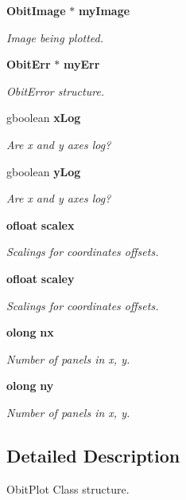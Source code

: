 \begin{CompactItemize}
{\bf Obit\-Image} $\ast$ {\bf my\-Image}
\begin{CompactList}\small\item\em Image being plotted. \item\end{CompactList}\item 
{\bf Obit\-Err} $\ast$ {\bf my\-Err}
\begin{CompactList}\small\item\em Obit\-Error structure. \item\end{CompactList}\item 
gboolean {\bf x\-Log}
\begin{CompactList}\small\item\em Are x and y axes log? \item\end{CompactList}\item 
gboolean {\bf y\-Log}
\begin{CompactList}\small\item\em Are x and y axes log? \item\end{CompactList}\item 
{\bf ofloat} {\bf scalex}
\begin{CompactList}\small\item\em Scalings for coordinates offsets. \item\end{CompactList}\item 
{\bf ofloat} {\bf scaley}
\begin{CompactList}\small\item\em Scalings for coordinates offsets. \item\end{CompactList}\item 
{\bf olong} {\bf nx}
\begin{CompactList}\small\item\em Number of panels in x, y. \item\end{CompactList}\item 
{\bf olong} {\bf ny}
\begin{CompactList}\small\item\em Number of panels in x, y. \item\end{CompactList}\end{CompactItemize}


\subsection{Detailed Description}
Obit\-Plot Class structure. 


